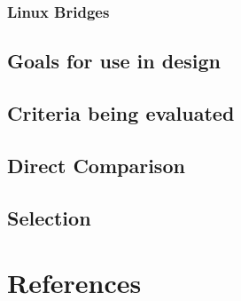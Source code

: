 \documentclass[10pt,letterpaper,onecolumn,draftclsnofoot]{IEEEtran}
\begin{document}
\subsubsection{Linux Bridges}

\subsubsection{}

\subsubsection{}

\subsection{Goals for use in design}

\subsection{Criteria being evaluated}

\subsubsection{}

\subsubsection{}

\subsubsection{}

\subsubsection{}

\subsection{Direct Comparison}

\subsection{Selection}

\section{References}



\end{document}
